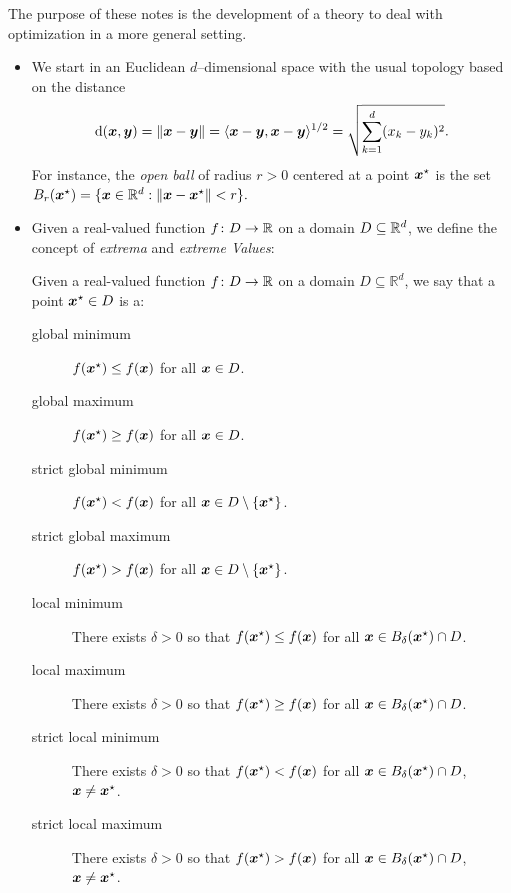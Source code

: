 The purpose of these notes is the development of a theory to deal with optimization in a more general setting.
\begin{itemize}
	\item We start in an Euclidean $d$--dimensional space with the usual topology based on the distance 
	\begin{equation*}
	\operatorname{d}(\boldsymbol{x},\boldsymbol{y})=\lVert \boldsymbol{x}-\boldsymbol{y} \rVert = \langle \boldsymbol{x}-\boldsymbol{y}, \boldsymbol{x}-\boldsymbol{y} \rangle^{1/2} = \sqrt{\sum_{k=1}^d (x_k-y_k)^2 }.
	\end{equation*}
	For instance, the \emph{open ball} of radius $r>0$ centered at a point $\boldsymbol{x}^{\star}$ is the set $B_r(\boldsymbol{x}^{\star}) = \{ \boldsymbol{x} \in \mathbb{R}^d : \lVert \boldsymbol{x}-\boldsymbol{x}^{\star} \rVert< r \}.$
	\item Given a real-valued function $f\colon D \to \mathbb{R}$ on a domain $D \subseteq \mathbb{R}^d$, we define the concept of \emph{extrema} and \emph{extreme Values}:
	\begin{definition}\label{def:extrema}
	Given a real-valued function $f\colon D \to \mathbb{R}$ on a domain $D \subseteq \mathbb{R}^d$, we say that a point $\boldsymbol{x}^{\star} \in D$ is a:
	\begin{description}
		\item [global minimum] $f(\boldsymbol{x}^{\star}) \leq f(\boldsymbol{x})$ for all $\boldsymbol{x} \in D$. 
		\item [global maximum] $f(\boldsymbol{x}^{\star}) \geq f(\boldsymbol{x})$ for all $\boldsymbol{x} \in D$. 
		\item [strict global minimum] $f(\boldsymbol{x}^{\star}) < f(\boldsymbol{x})$ for all $\boldsymbol{x} \in D \setminus \{ \boldsymbol{x}^{\star} \}$. 
		\item [strict global maximum] $f(\boldsymbol{x}^{\star}) > f(\boldsymbol{x})$ for all $\boldsymbol{x} \in D \setminus \{ \boldsymbol{x}^{\star} \}$. 
		\item [local minimum] There exists $\delta>0$ so that  $f(\boldsymbol{x}^{\star}) \leq f(\boldsymbol{x})$ for all $\boldsymbol{x} \in B_\delta(\boldsymbol{x}^{\star})\cap D$. 
		\item [local maximum] There exists $\delta>0$ so that  $f(\boldsymbol{x}^{\star}) \geq f(\boldsymbol{x})$ for all $\boldsymbol{x} \in B_\delta(\boldsymbol{x}^{\star})\cap D$. 
		\item [strict local minimum] There exists $\delta>0$ so that  $f(\boldsymbol{x}^{\star}) < f(\boldsymbol{x})$ for all $\boldsymbol{x} \in B_\delta(\boldsymbol{x}^{\star})\cap D$, $\boldsymbol{x} \neq \boldsymbol{x}^{\star}$. 
		\item [strict local maximum] There exists $\delta>0$ so that  $f(\boldsymbol{x}^{\star}) > f(\boldsymbol{x})$ for all $\boldsymbol{x} \in B_\delta(\boldsymbol{x}^{\star})\cap D$, $\boldsymbol{x} \neq \boldsymbol{x}^{\star}$. 
	\end{description}
	\end{definition}	
\end{itemize}
